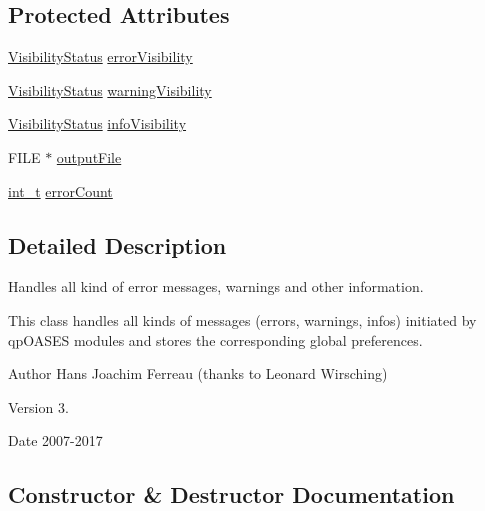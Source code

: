 \subsection*{Protected Attributes}
\begin{DoxyCompactItemize}
\item 
\hyperlink{_types_8hpp_a36503475bb1fea0a7fd7087259ee63c1}{Visibility\+Status} \hyperlink{class_message_handling_af75a2fd3122cc2a9793c5ad491b04325}{error\+Visibility}
\item 
\hyperlink{_types_8hpp_a36503475bb1fea0a7fd7087259ee63c1}{Visibility\+Status} \hyperlink{class_message_handling_af715e377af244418a8003b172c8bdf91}{warning\+Visibility}
\item 
\hyperlink{_types_8hpp_a36503475bb1fea0a7fd7087259ee63c1}{Visibility\+Status} \hyperlink{class_message_handling_a6a630fa427803cf4e1e0f54d8fb14a1b}{info\+Visibility}
\item 
F\+I\+LE $\ast$ \hyperlink{class_message_handling_a2a40cbdfced701a18da281f7a4e910ee}{output\+File}
\item 
\hyperlink{_types_8hpp_ab6fd6105e64ed14a0c9281326f05e623}{int\+\_\+t} \hyperlink{class_message_handling_a762bbeac9042fc5ccb406bbb8b7c72d2}{error\+Count}
\end{DoxyCompactItemize}


\subsection{Detailed Description}
Handles all kind of error messages, warnings and other information. 

This class handles all kinds of messages (errors, warnings, infos) initiated by qp\+O\+A\+S\+ES modules and stores the corresponding global preferences.

\begin{DoxyAuthor}{Author}
Hans Joachim Ferreau (thanks to Leonard Wirsching) 
\end{DoxyAuthor}
\begin{DoxyVersion}{Version}
3. 
\end{DoxyVersion}
\begin{DoxyDate}{Date}
2007-\/2017 
\end{DoxyDate}


\subsection{Constructor \& Destructor Documentation}
\mbox{\label{class_message_handling_a58a64d6d798a87ed2f83092e28e7ee8b}} 
